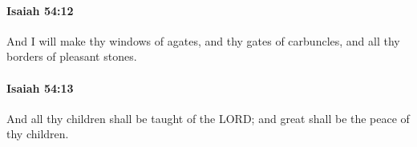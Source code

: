		\paragraph{Isaiah 54:12} %
			\label{ISAIAH-54-12}

			And I will make thy windows of agates, and thy gates of carbuncles, and all thy borders of pleasant stones.


		\paragraph{Isaiah 54:13} %
			\label{ISAIAH-54-13}

			And all thy children shall be taught of the LORD; and great shall be the peace of thy children.


